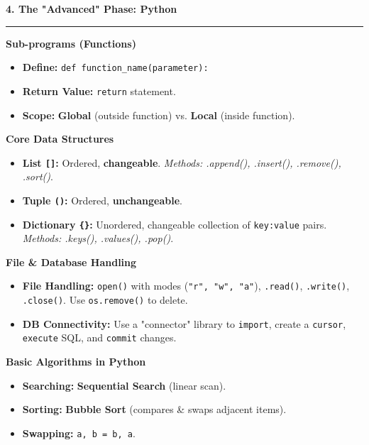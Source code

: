 \documentclass[a4paper, 8pt]{extarticle}
\newcommand{\sectionheading}[1]{\large\textbf{#1}\par\noindent\rule{\linewidth}{0.4pt}}
\newcommand{\subsectionheading}[1]{\normalsize\textbf{#1}}
\begin{document}
\begin{multicols}{2}
\vspace{1em}
\sectionheading{4. The "Advanced" Phase: Python}
\vspace{0.5em}
\subsectionheading{Sub-programs (Functions)}
\begin{itemize}
    \item \textbf{Define:} \texttt{def function\_name(parameter):}
    \item \textbf{Return Value:} \texttt{return} statement.
    \item \textbf{Scope:} \textbf{Global} (outside function) vs. \textbf{Local} (inside function).
\end{itemize}
\subsectionheading{Core Data Structures}
\begin{tcolorbox}
\begin{itemize}
    \item \textbf{List \texttt{[]}:} Ordered, \textbf{changeable}. \textit{Methods: .append(), .insert(), .remove(), .sort()}.
    \item \textbf{Tuple \texttt{()}:} Ordered, \textbf{unchangeable}.
    \item \textbf{Dictionary \texttt{\{\}}:} Unordered, changeable collection of \texttt{key:value} pairs. \textit{Methods: .keys(), .values(), .pop()}.
\end{itemize}
\end{tcolorbox}
\subsectionheading{File & Database Handling}
\begin{itemize}
    \item \textbf{File Handling:} \texttt{open()} with modes (\texttt{"r", "w", "a"}), \texttt{.read()}, \texttt{.write()}, \texttt{.close()}. Use \texttt{os.remove()} to delete.
    \item \textbf{DB Connectivity:} Use a "connector" library to \texttt{import}, create a \texttt{cursor}, \texttt{execute} SQL, and \texttt{commit} changes.
\end{itemize}
\subsectionheading{Basic Algorithms in Python}
\begin{itemize}
    \item \textbf{Searching:} \textbf{Sequential Search} (linear scan).
    \item \textbf{Sorting:} \textbf{Bubble Sort} (compares \& swaps adjacent items).
    \item \textbf{Swapping:} \texttt{a, b = b, a}.
\end{itemize}

\end{multicols}
\end{document}
